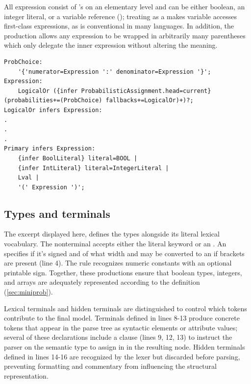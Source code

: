 All expression consist of 's on an elementary level and can be either boolean, an integer literal, or a variable reference (); treating  as a  makes variable accesses first-class expressions,
as is conventional in many languages. In addition, the production allows any expression to be wrapped in arbitrarily many parentheses which only delegate the inner expression without altering the meaning.

\begin{verbatim}
ProbChoice:
    '{'numerator=Expression ':' denominator=Expression '}';
Expression:
    LogicalOr ({infer ProbabilisticAssignment.head=current} (probabilities+=(ProbChoice) fallbacks+=LogicalOr)+)?;
LogicalOr infers Expression:
.
.
.
Primary infers Expression:
    {infer BoolLiteral} literal=BOOL | 
    {infer IntLiteral} literal=IntegerLiteral |
    Lval |
    '(' Expression ')';
\end{verbatim}

\subsection*{Types and terminals}

The excerpt displayed here, defines the types alongside its literal lexical vocabulary. The nonterminal  accepts either the literal keyword  or an . An  specifies if it's signed and of what width and may be converted to an  if brackets are present (line 4).
The  rule recognizes numeric constants with an optional printable sign. Together, these productions ensure that boolean types, integers, and arrays are adequately represented according to the  definition (\ref{sec:miniprob}).

Lexical terminals and hidden terminals are distinguished to control which tokens contribute to the final model. Terminals defined in lines 8-13 produce concrete tokens that appear in the parse tree as syntactic elements or attribute values; several of these declarations include a  clause (lines 9, 12, 13) to instruct the parser on the semantic type to assign in
in the resulting node. Hidden terminals defined in lines 14-16 are recognized by the lexer but discarded before parsing, preventing formatting and commentary from influencing the structural representation.

